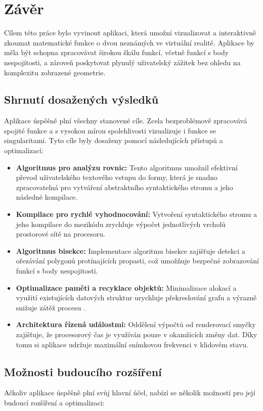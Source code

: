\documentclass[czech, kiv, sem, he, iso690alph, pdf,viewonly]{fasthesis}
\begin{document}
\chapter{Závěr}
Cílem této práce bylo vyvinout aplikaci, která umožní vizualizovat a interaktivně zkoumat matematické funkce o dvou neznámých ve virtuální realitě. 
Aplikace by měla být schopna zpracovávat širokou škálu funkcí, včetně funkcí s body nespojitosti, a zároveň poskytovat plynulý uživatelský zážitek bez ohledu na komplexitu zobrazené geometrie.

\section{Shrnutí dosažených výsledků}
Aplikace úspěšně plní všechny stanovené cíle. 
Zcela bezproblémově zpracovává spojité funkce a s vysokou mírou spolehlivosti vizualizuje i funkce se singularitami. 
Tyto cíle byly dosaženy pomocí následujících přístupů a optimalizací:

\begin{itemize}
    \item \textbf{Algoritmus  pro analýzu rovnic:} Tento algoritmus umožnil efektivní převod uživatelského textového vstupu do formy, 
    která je snadno zpracovatelná pro vytváření abstraktního syntaktického stromu a jeho následné kompilace.
    \item \textbf{Kompilace pro rychlé vyhodnocování:} Vytvoření syntaktického stromu a jeho kompilace do mezikódu zrychluje výpočet jednotlivých vrcholů prostorové sítě na procesoru.
    \item \textbf{Algoritmus bisekce:} Implementace algoritmu bisekce zajišťuje detekci a ořezávání polygonů protínajících propasti, což umožňuje bezpečné zobrazování funkcí s body nespojitosti.
    \item \textbf{Optimalizace paměti a recyklace objektů:} Minimalizace alokací a využití existujících datových struktur urychluje překreslování grafu a výrazně snižuje zátěž procesu .
    \item \textbf{Architektura řízená událostmi:} Oddělení výpočtů od renderovací smyčky zajišťuje, že procesorový čas je využíván pouze v okamžicích změny dat. 
    Díky tomu si aplikace udržuje maximální snímkovou frekvenci v klidovém stavu.
\end{itemize}

\section{Možnosti budoucího rozšíření}
Ačkoliv aplikace úspěšně plní svůj hlavní účel, nabízí se několik možností pro její budoucí rozšíření a optimalizaci:
\end{document}
